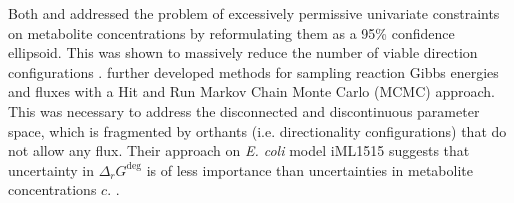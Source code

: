





Both \textcite{gollub_2021_prob_sampling} and \textcite{vishnu_2021_multiTFA} addressed the problem of excessively permissive univariate constraints on metabolite concentrations by reformulating them as a 95\% confidence ellipsoid. This was shown to massively reduce the number of viable direction configurations \cite{gollub_2021_prob_sampling}. \textcite{gollub_2021_prob_sampling} further developed methods for sampling reaction Gibbs energies and fluxes with a Hit and Run Markov Chain Monte Carlo (MCMC) approach. This was necessary to address the disconnected and discontinuous parameter space, which is fragmented by orthants (i.e. directionality configurations) that do not allow any flux. Their approach on \textit{E. coli} model iML1515 \cite{monk_2017_ecoli} suggests that uncertainty in $\Delta_rG^\deg$ is of less importance than uncertainties in metabolite concentrations $c$.  .  